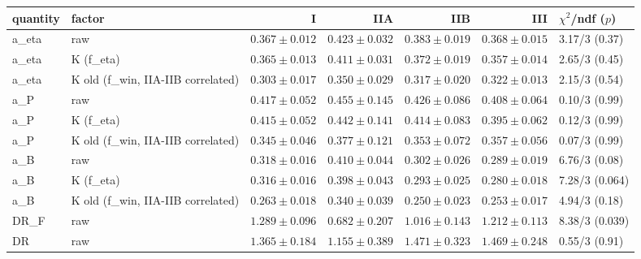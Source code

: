 \begin{tabular}{llrrrrl}
\toprule
quantity & factor & I & IIA & IIB & III & $\chi^2$/ndf ($p$) \\
\midrule
a\_eta & raw & $0.367\pm0.012$ & $0.423\pm0.032$ & $0.383\pm0.019$ & $0.368\pm0.015$ & 3.17/3 (0.37) \\
a\_eta & K (f\_eta) & $0.365\pm0.013$ & $0.411\pm0.031$ & $0.372\pm0.019$ & $0.357\pm0.014$ & 2.65/3 (0.45) \\
a\_eta & K old (f\_win, IIA-IIB correlated) & $0.303\pm0.017$ & $0.350\pm0.029$ & $0.317\pm0.020$ & $0.322\pm0.013$ & 2.15/3 (0.54) \\
a\_P & raw & $0.417\pm0.052$ & $0.455\pm0.145$ & $0.426\pm0.086$ & $0.408\pm0.064$ & 0.10/3 (0.99) \\
a\_P & K (f\_eta) & $0.415\pm0.052$ & $0.442\pm0.141$ & $0.414\pm0.083$ & $0.395\pm0.062$ & 0.12/3 (0.99) \\
a\_P & K old (f\_win, IIA-IIB correlated) & $0.345\pm0.046$ & $0.377\pm0.121$ & $0.353\pm0.072$ & $0.357\pm0.056$ & 0.07/3 (0.99) \\
a\_B & raw & $0.318\pm0.016$ & $0.410\pm0.044$ & $0.302\pm0.026$ & $0.289\pm0.019$ & 6.76/3 (0.08) \\
a\_B & K (f\_eta) & $0.316\pm0.016$ & $0.398\pm0.043$ & $0.293\pm0.025$ & $0.280\pm0.018$ & 7.28/3 (0.064) \\
a\_B & K old (f\_win, IIA-IIB correlated) & $0.263\pm0.018$ & $0.340\pm0.039$ & $0.250\pm0.023$ & $0.253\pm0.017$ & 4.94/3 (0.18) \\
DR\_F & raw & $1.289\pm0.096$ & $0.682\pm0.207$ & $1.016\pm0.143$ & $1.212\pm0.113$ & 8.38/3 (0.039) \\
DR & raw & $1.365\pm0.184$ & $1.155\pm0.389$ & $1.471\pm0.323$ & $1.469\pm0.248$ & 0.55/3 (0.91) \\
\bottomrule
\end{tabular}
